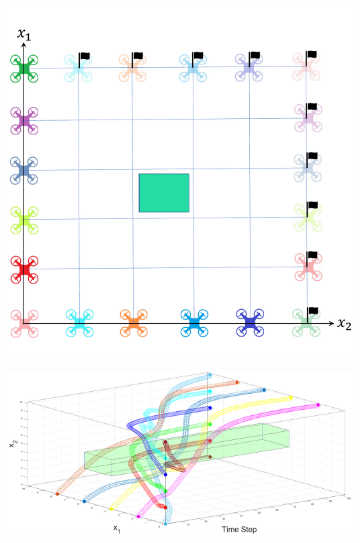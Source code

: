 \begin{figure}[t]
    \large
     \centering
     \begin{subfigure}[b]{0.2\textwidth}
         \centering
         \includegraphics[width=\textwidth]{figures/multidrone.pdf}
         \caption{}
         \label{fig:MA}
     \end{subfigure}
     \hfill
     \begin{subfigure}[b]{0.39\textwidth}
         \centering
         \includegraphics[width=\textwidth]{figures/tr10_final.eps}
         \caption{}
         \label{fig:3dtubes}
     \end{subfigure}
     \hfill
     \begin{subfigure}[b]{0.4\textwidth}
         \centering

\end{subfigure}
\end{figure}
